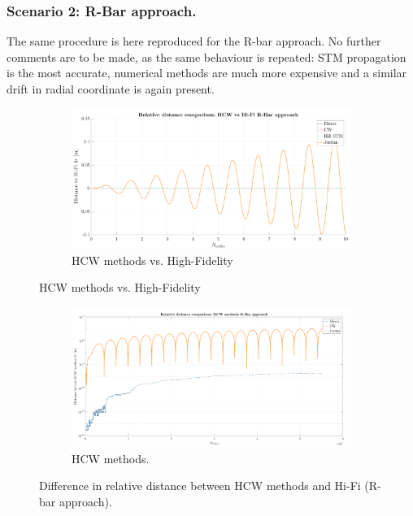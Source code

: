 		\subsubsection{Scenario 2: R-Bar approach. }
		\indent The same procedure is here reproduced for the R-bar approach. No further comments are to be made, as the same behaviour is repeated: STM propagation is the most accurate, numerical methods are much more expensive and a similar drift in radial coordinate is again present.
		\begin{figure}[!htb]
		\centering
		\begin{subfigure}[t]{\linewidth}
		\begin{changemargin}{-1.3cm}{-1cm}
		\begin{adjustbox}{width=1.1\textwidth}
		\centering\includegraphics[width = \linewidth]{Chapters/Chapter_02/High_quality/dr_comp_HiFi_R_bar_approach}
		\end{adjustbox}
		\end{changemargin}
		\caption{HCW methods vs. High-Fidelity}
		\label{figCh2:dr_comp_HiFi_R_bar_approach}
		\end{subfigure}
		\end{figure}
		\begin{figure}[!htb]
		\ContinuedFloat
		\centering
		\begin{subfigure}[t]{\linewidth}
		\begin{changemargin}{-1.3cm}{-1cm}
		\begin{adjustbox}{width=1.1\textwidth}
		\centering\includegraphics[width = \linewidth]{Chapters/Chapter_02/High_quality/dr_comp_HCW_R_bar_approach}
		\end{adjustbox}
		\end{changemargin}
		\caption{HCW methods.}
		\label{figCh2:dr_comp_HCW_R_bar_approach}
		\end{subfigure}
		\caption{Difference in relative distance between HCW methods and Hi-Fi (R-bar approach).}
		\end{figure}
